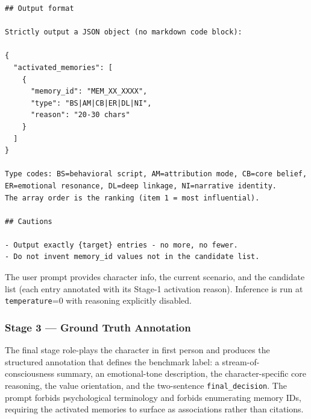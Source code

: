 \begin{tcolorbox}[
  breakable,
  colback=blue!5,
  colframe=blue!60!black,
  title={\textbf{Stage 2 — Activated-Memory Refinement Prompt}},
  fonttitle=\bfseries,
  rounded corners,
  boxrule=1.0pt
]
\begin{Verbatim}[fontsize=\scriptsize, breaklines=true, breaksymbolleft={}, breaksymbolright={}, breakindent=1em]
## Output format

Strictly output a JSON object (no markdown code block):

{
  "activated_memories": [
    {
      "memory_id": "MEM_XX_XXXX",
      "type": "BS|AM|CB|ER|DL|NI",
      "reason": "20-30 chars"
    }
  ]
}

Type codes: BS=behavioral script, AM=attribution mode, CB=core belief, ER=emotional resonance, DL=deep linkage, NI=narrative identity.
The array order is the ranking (item 1 = most influential).

## Cautions

- Output exactly {target} entries - no more, no fewer.
- Do not invent memory_id values not in the candidate list.
\end{Verbatim}
\end{tcolorbox}

The user prompt provides character info, the current scenario, and the candidate list (each entry annotated with its Stage-1 activation reason). Inference is run at \texttt{temperature}=0 with reasoning explicitly disabled.

\subsubsection{Stage 3 — Ground Truth Annotation}
\label{app:prompt_gt}

The final stage role-plays the character in first person and produces the structured annotation that defines the benchmark label: a stream-of-consciousness summary, an emotional-tone description, the character-specific core reasoning, the value orientation, and the two-sentence \texttt{final\_decision}. The prompt forbids psychological terminology and forbids enumerating memory IDs, requiring the activated memories to surface as associations rather than citations.

